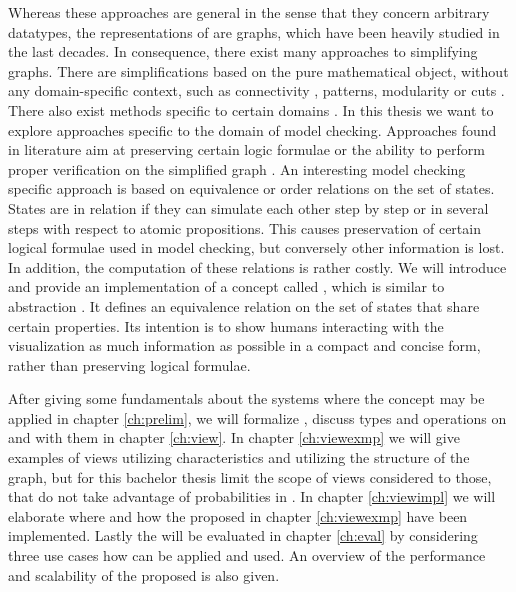 \documentclass[preview]{standalone}
\begin{document}
Whereas these approaches are general in the sense that they concern arbitrary datatypes, the representations of \mdpsN are graphs, which have been heavily studied in the last decades. In consequence, there exist many approaches to simplifying graphs. There are simplifications based on the pure mathematical object, without any domain-specific context, such as connectivity \cite{Zhou2010}, patterns\cite{Soldano2014}, modularity \cite{Arenas2007} or cuts \cite{Goerke2009,Fung2011}. There also exist methods specific to certain domains \cite{Ruan2011,Li2022,Yaw2019}. In this thesis we want to explore approaches specific to the domain of model checking. Approaches found in literature aim at preserving certain logic formulae or the ability to perform proper verification on the simplified graph \cite{Rensink2012,Bonchi2013,Boneva2007}. An interesting model checking specific approach is based on equivalence or order relations on the set of states. States are in relation if they can simulate each other step by step or in several steps with respect to atomic propositions. This causes preservation of certain logical formulae used in model checking, but conversely other information is lost. In addition, the computation of these relations is rather costly. We will introduce and provide an implementation of a concept called \viewN, which is similar to abstraction \cite[p. 499]{Baier2008}. It defines an equivalence relation on the set of states that share certain properties. Its intention is to show humans interacting with the visualization as much information as possible in a compact and concise form, rather than preserving logical formulae.

After giving some fundamentals about the systems where the concept \viewN may be applied in chapter \ref{ch:prelim}, we will formalize \viewsN, discuss types and operations on and with them in chapter \ref{ch:view}. In chapter \ref{ch:viewexmp} we will give examples of views utilizing \chgphN characteristics and \viewsN utilizing the structure of the \chgphN graph, but for this bachelor thesis limit the scope of views considered to those, that do not take advantage of probabilities in \chgphsN. In chapter \ref{ch:viewimpl} we will elaborate where and how the \viewsN proposed in chapter \ref{ch:viewexmp} have been implemented. Lastly the \viewsN will be evaluated in chapter \ref{ch:eval} by considering three use cases how \viewsN can be applied and used. An overview of the performance and scalability of the proposed \viewsN is also given. 
\end{document}
